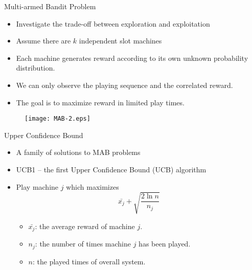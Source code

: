 \begin{frame}{Multi-armed Bandit Problem}
  \begin{itemize}
    \item Investigate the trade-off between exploration and exploitation
      \vspace*{10pt}
    \item Assume there are $k$ independent slot machines
      \vspace*{10pt}
    \item Each machine generates reward according to its own unknown probability
      distribution.
      \vspace*{10pt}
    \item We can only observe the playing sequence and the correlated
      reward.
      \vspace*{10pt}
    \item The goal is to maximize reward in limited play times.
      \vspace*{10pt}
  \end{itemize}
  \begin{figure}
    \flushright
    \texttt{[image: MAB-2.eps]}
  \end{figure}
\end{frame}

\begin{frame}{Upper Confidence Bound }
  \begin{itemize}
    \item A family of solutions to MAB problems
      \vspace*{14pt}
    \item UCB1 -- the first Upper Confidence Bound (UCB) algorithm
      \vspace*{14pt}
    \item Play machine $j$ which maximizes
      \[\bar{x_j} + \sqrt{\frac{2\ln n}{n_j}}\]
      \begin{itemize}
        \item $\bar{x_j}$: the average reward of machine $j$.
        \item $n_j$: the number of times machine $j$ has been played.
        \item $n$: the played times of overall system.
      \end{itemize} 
  \end{itemize}
\end{frame}


